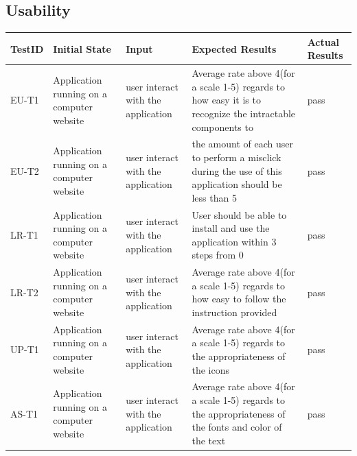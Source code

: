 \documentclass[12pt, titlepage]{article}
\begin{document}
\subsection{Usability}
\begin{tabular}{ |p{2cm}| p{3cm}| p{4cm}| p{4cm}|p{2cm}|  } 
 \hline
 TestID & Initial State & Input & Expected Results & Actual Results \\ 
 \hline
 EU-T1 & Application running on a computer website & user interact with the application & Average rate above 4(for a scale 1-5) regards to how easy it is to recognize the intractable components to  & pass\\
  \hline
 EU-T2 & Application running on a computer website & user interact with the application & the amount of each user to perform a misclick during the use of this application should be less than 5  & pass\\
  \hline
 LR-T1 & Application running on a computer website & user interact with the application & User should be able to install and use the application within 3 steps from 0 & pass\\
\hline
 LR-T2 & Application running on a computer website & user interact with the application & Average rate above 4(for a scale 1-5) regards to how easy to follow the instruction provided & pass\\
\hline
 UP-T1 & Application running on a computer website & user interact with the application & Average rate above 4(for a scale 1-5) regards to the appropriateness of the icons  & pass\\
 \hline
 AS-T1 & Application running on a computer website & user interact with the application & Average rate above 4(for a scale 1-5) regards to the appropriateness of the fonts and color of the text  & pass\\
 \hline
\end{tabular}	
\end{document}
